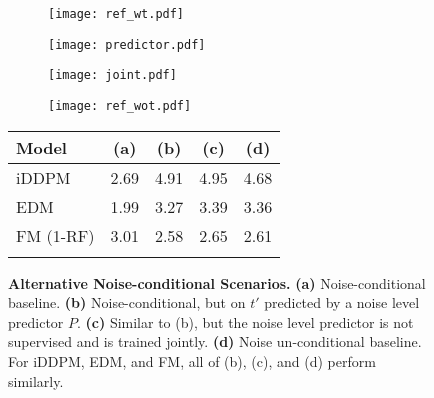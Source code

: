 \begin{figure}[t]
    \begin{minipage}{1.0\linewidth}
        \centering
        \hfill
        \begin{subfigure}[b]{0.248\linewidth}
            \centering
            \texttt{[image: ref\_wt.pdf]}
            \caption{ }\label{fig:wt_ref_explain}
        \end{subfigure}
        \hspace*{-0.1cm}
        \begin{subfigure}[b]{0.248\linewidth}
            \centering
            \texttt{[image: predictor.pdf]}
            \caption{ }\label{fig:pred_explain}
        \end{subfigure}
        \hspace{-0.2cm}
        \begin{subfigure}[b]{0.248\linewidth}
            \centering
            \texttt{[image: joint.pdf]}
            \caption{ }\label{fig:joint_explain}
        \end{subfigure}
        \hspace*{-0.25cm}
        \begin{subfigure}[b]{0.248\linewidth}
            \centering
            \texttt{[image: ref\_wot.pdf]}
            \caption{ }\label{fig:wot_ref_explain}
        \end{subfigure}
        \hfill
    \end{minipage}
    \vspace{1em} \par 
    \begin{minipage}{1.0\linewidth}
 {{\setlength{\extrarowheight}{1.5pt}}
        \centering
        \begin{adjustbox}{max width=\linewidth}
        \scriptsize
        \hspace*{1.6cm}
        \renewcommand{\arraystretch}{1.3}
        \begin{tabular}{l|c|ccc}
            \Xhline{3\arrayrulewidth}
 Model & (a) & (b) & (c) & (d)  \\
            \hline
 iDDPM         & 2.69 & 4.91  & 4.95 & 4.68 \\
 EDM           & 1.99 & 3.27  & 3.39 & 3.36 \\
 FM (1-RF)     & 3.01 & 2.58  & 2.65 & 2.61 \\
            \Xhline{3\arrayrulewidth}
        \end{tabular}
        \end{adjustbox}
 }
    \end{minipage}
    \caption{
\textbf{Alternative Noise-conditional Scenarios.} \textbf{(a)} Noise-conditional baseline. \textbf{(b)} Noise-conditional, but on $t'$ predicted by a noise level predictor $P$. \textbf{(c)} Similar to (b), but the noise level predictor is not supervised and is trained jointly. \textbf{(d)} Noise un-conditional baseline. For iDDPM, EDM, and FM, all of (b), (c), and (d) perform similarly.
    }\label{fig:four_variants}
\end{figure}

